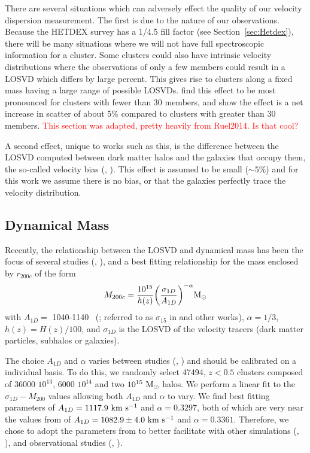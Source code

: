 \documentclass[apj, revtex4]{emulateapj}
\newcommand{\editorial}[1]{\textcolor{red}{#1}}
\newcommand{\citeeg}[1]{(\eg, \citealt{#1})}
\begin{document}
There are several situations which can adversely effect the quality of our velocity dispersion measurement. The first is due to the nature of our observations. Because the HETDEX survey has a 1/4.5 fill factor (see Section~\ref{sec:Hetdex}), there will be many situations where we will not have full spectroscopic information for a cluster. Some clusters could also have intrinsic velocity distributions where the observations of only a few members could result in a LOSVD which differs by large percent. This gives rise to clusters along a fixed mass having a large range of possible LOSVDs. \cite{Saro2013} find this effect to be most pronounced for clusters with fewer than 30 members, and \cite{Ruel2014} show the effect is a net increase in scatter of about 5\% compared to clusters with greater than 30 members. \editorial{This section was adapted, pretty heavily from Ruel2014. Is that cool?}

A second effect, unique to works such as this, is the difference between the LOSVD computed between dark matter halos and the galaxies that occupy them, the so-called velocity bias \citeeg{Evrard2008, White2010}. This effect is assumed to be small ($\sim5\%$) and for this work we assume there is no bias, or that the galaxies perfectly trace the velocity distribution.

\subsection{Dynamical Mass}\label{sec:mass}
Recently, the relationship between the LOSVD and dynamical mass has been the focus of several studies \citeeg{Evrard2008, Saro2013, Sifon2013, VanderBurg2014}, and a best fitting relationship for the mass enclosed by $r_{200c}$ of the form
\begin{equation}
	M_{200c} = \frac{10^{15}}{h(z)} \bigg{(}\frac{\sigma_{1D}}{A_{1D}} \bigg{)}^{-\alpha} \hbox{$\mathrm{M}_\odot$}
\end{equation}
with $A_{1D} =$ 1040-1140 \kms\ (\citealt{Munari2013}; referred to as $\sigma_{15}$ in \citealt{Evrard2008} and other works), $\alpha = 1/3$, $h(z) = H(z)/100$, and $\sigma_{1D}$ is the LOSVD of the velocity tracers (dark matter particles, subhalos or galaxies).

The choice $A_{1D}$ and $\alpha$ varies between studies \citeeg{Munari2013, VanderBurg2014} and should be calibrated on a individual basis. To do this, we randomly select 47494, $z<0.5$ clusters composed of 36000 $10^{13}$, 6000 $10^{14}$ and two $10^{15}~\hbox{$\mathrm{M}_\odot$}$ halos. We perform a linear fit to the $\sigma_{1D}-M_{200}$ values allowing both $A_{1D}$ and $\alpha$ to vary. We find best fitting parameters of $A_{1D} = 1117.9~\hbox{km~s$^{-1}$}$ and $\alpha = 0.3297$, both of which are very near the values from \cite{Evrard2008} of $A_{1D} = 1082.9 \pm 4.0~\hbox{km~s$^{-1}$}$ and $\alpha = 0.3361$. Therefore, we chose to adopt the parameters from \cite{Evrard2008} to better facilitate with other simulations \citeeg{Old2014}, and observational studies \citeeg{Brodwin2010}.
\end{document}
